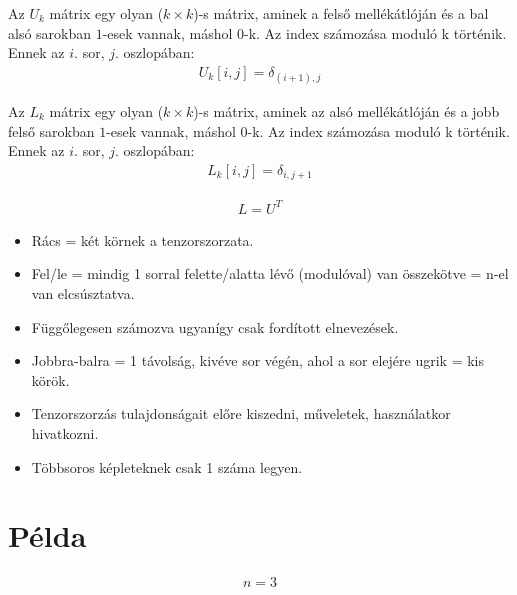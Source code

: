 \begin{definition}
  Az $U_{k}$ mátrix egy olyan ($k\times{}k$)-s mátrix, aminek a felső mellékátlóján és a bal alsó sarokban
  $1$-esek vannak, máshol $0$-k.
  Az index számozása moduló k történik.
  Ennek az $i$. sor, $j$. oszlopában:
  \begin{align}
    U_{k}[i,j] = \delta_{(i+1),j}
  \end{align}
\end{definition}

\begin{definition}
  Az $L_{k}$ mátrix egy olyan ($k\times{}k$)-s mátrix, aminek az alsó mellékátlóján és a jobb felső sarokban
  $1$-esek vannak, máshol $0$-k.
  Az index számozása moduló k történik.
  Ennek az $i$. sor, $j$. oszlopában:
  \begin{align}
    L_{k}[i,j] = \delta_{i,j+1}
  \end{align}
\end{definition}

\begin{align}
  L = U^{T}
\end{align}


\begin{itemize}
  \item Rács = két körnek a tenzorszorzata.
  \item Fel/le = mindig 1 sorral felette/alatta lévő (modulóval) van összekötve = n-el van elcsúsztatva.
  \item Függőlegesen számozva ugyanígy csak fordított elnevezések.
  \item Jobbra-balra = 1 távolság, kivéve sor végén, ahol a sor elejére ugrik = kis körök.
  \item Tenzorszorzás tulajdonságait előre kiszedni, műveletek, használatkor hivatkozni.
  \item Többsoros képleteknek csak 1 száma legyen.
\end{itemize}

\section{Példa}

\begin{align}
  n = 3
\end{align}


